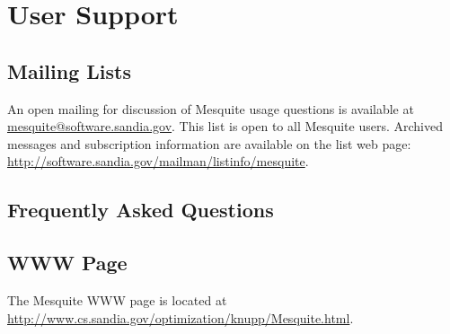 \chapter{User Support}

\section{Mailing Lists}

An open mailing for discussion of Mesquite usage questions is available at
\href{mailto:mesquite@software.sandia.gov}{mesquite@software.sandia.gov}.  This list is open to all Mesquite users.  
Archived messages and subscription information are available on the list web 
page: 
\href{http://software.sandia.gov/mailman/listinfo/mesquite}{http://software.sandia.gov/mailman/listinfo/mesquite}.

\section{Frequently Asked Questions}

\section{WWW Page}

The Mesquite WWW page is located at 
\url{http://www.cs.sandia.gov/optimization/knupp/Mesquite.html}.
